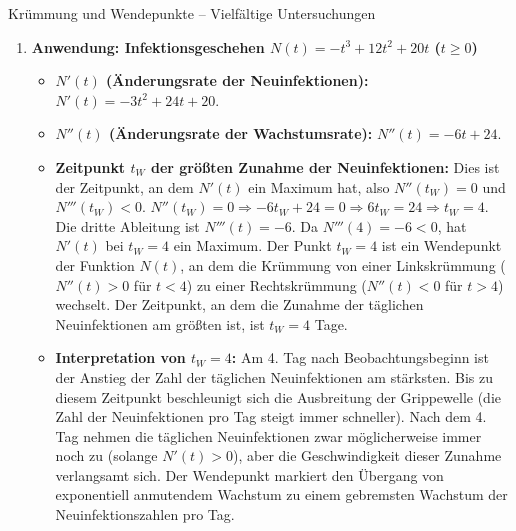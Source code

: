 \begin{loesungsumgebung}{Krümmung und Wendepunkte – Vielfältige Untersuchungen}
\begin{enumerate}[label=(\alph*)]
    \item \textbf{Anwendung: Infektionsgeschehen $N(t) = -t^3 + 12t^2 + 20t$ ($t \ge 0$)}
    \begin{itemize}
        \item \textbf{$N'(t)$ (Änderungsrate der Neuinfektionen):}
        $N'(t) = -3t^2 + 24t + 20$.
        \item \textbf{$N''(t)$ (Änderungsrate der Wachstumsrate):}
        $N''(t) = -6t + 24$.
        \item \textbf{Zeitpunkt $t_W$ der größten Zunahme der Neuinfektionen:}
        Dies ist der Zeitpunkt, an dem $N'(t)$ ein Maximum hat, also $N''(t_W)=0$ und $N'''(t_W)<0$.
        $N''(t_W)=0 \Rightarrow -6t_W + 24 = 0 \Rightarrow 6t_W = 24 \Rightarrow t_W = 4$.
        Die dritte Ableitung ist $N'''(t) = -6$.
        Da $N'''(4) = -6 < 0$, hat $N'(t)$ bei $t_W=4$ ein Maximum. Der Punkt $t_W=4$ ist ein Wendepunkt der Funktion $N(t)$, an dem die Krümmung von einer Linkskrümmung ($N''(t)>0$ für $t<4$) zu einer Rechtskrümmung ($N''(t)<0$ für $t>4$) wechselt.
        Der Zeitpunkt, an dem die Zunahme der täglichen Neuinfektionen am größten ist, ist $t_W = 4$ Tage.
        \item \textbf{Interpretation von $t_W=4$:}
        Am 4. Tag nach Beobachtungsbeginn ist der Anstieg der Zahl der täglichen Neuinfektionen am stärksten. Bis zu diesem Zeitpunkt beschleunigt sich die Ausbreitung der Grippewelle (die Zahl der Neuinfektionen pro Tag steigt immer schneller). Nach dem 4. Tag nehmen die täglichen Neuinfektionen zwar möglicherweise immer noch zu (solange $N'(t)>0$), aber die Geschwindigkeit dieser Zunahme verlangsamt sich. Der Wendepunkt markiert den Übergang von exponentiell anmutendem Wachstum zu einem gebremsten Wachstum der Neuinfektionszahlen pro Tag.
    \end{itemize}


\end{enumerate}
\end{loesungsumgebung}
